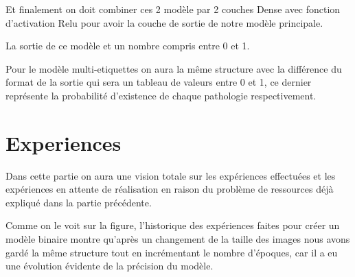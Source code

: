 Et finalement on doit combiner ces 2 modèle par 2 couches Dense avec fonction d’activation Relu pour avoir la couche de sortie de notre modèle principale.

La sortie de ce modèle et un nombre compris entre 0 et 1.

Pour le modèle multi-etiquettes on aura la même structure avec la différence du format de la sortie qui sera un tableau de valeurs entre 0 et 1, ce dernier représente la probabilité d'existence de chaque pathologie respectivement.


\section{Experiences}

Dans cette partie on aura une vision totale sur les expériences effectuées et les expériences en attente de réalisation en raison du problème de ressources déjà expliqué dans la partie précédente.

Comme on le voit sur la figure, l'historique des expériences faites pour créer un modèle binaire montre qu’après un changement de la taille des images nous avons gardé la même structure tout en incrémentant le nombre d'époques, car il a eu une évolution évidente de la précision du modèle.


